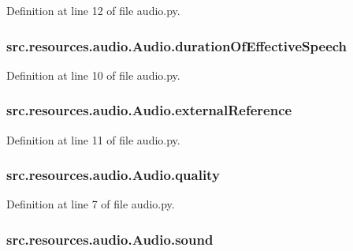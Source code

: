 Definition at line 12 of file audio.\+py.

\hypertarget{classsrc_1_1resources_1_1audio_1_1_audio_a0d0e84fdb0fd8961b8c033dc8d9782ac}{
\subsubsection[{duration\+Of\+Effective\+Speech}]{\setlength{\rightskip}{0pt plus 5cm}src.\+resources.\+audio.\+Audio.\+duration\+Of\+Effective\+Speech}}\label{classsrc_1_1resources_1_1audio_1_1_audio_a0d0e84fdb0fd8961b8c033dc8d9782ac}


Definition at line 10 of file audio.\+py.

\hypertarget{classsrc_1_1resources_1_1audio_1_1_audio_ac1da212e2eea3e4fa6ddb5f48c7364c2}{
\subsubsection[{external\+Reference}]{\setlength{\rightskip}{0pt plus 5cm}src.\+resources.\+audio.\+Audio.\+external\+Reference}}\label{classsrc_1_1resources_1_1audio_1_1_audio_ac1da212e2eea3e4fa6ddb5f48c7364c2}


Definition at line 11 of file audio.\+py.

\hypertarget{classsrc_1_1resources_1_1audio_1_1_audio_a8ec1034a29b3c55692fae3be07f54605}{
\subsubsection[{quality}]{\setlength{\rightskip}{0pt plus 5cm}src.\+resources.\+audio.\+Audio.\+quality}}\label{classsrc_1_1resources_1_1audio_1_1_audio_a8ec1034a29b3c55692fae3be07f54605}


Definition at line 7 of file audio.\+py.

\hypertarget{classsrc_1_1resources_1_1audio_1_1_audio_a549dd2605f3d2d09ca8a8618ddf34fc9}{
\subsubsection[{sound}]{\setlength{\rightskip}{0pt plus 5cm}src.\+resources.\+audio.\+Audio.\+sound}}\label{classsrc_1_1resources_1_1audio_1_1_audio_a549dd2605f3d2d09ca8a8618ddf34fc9}


